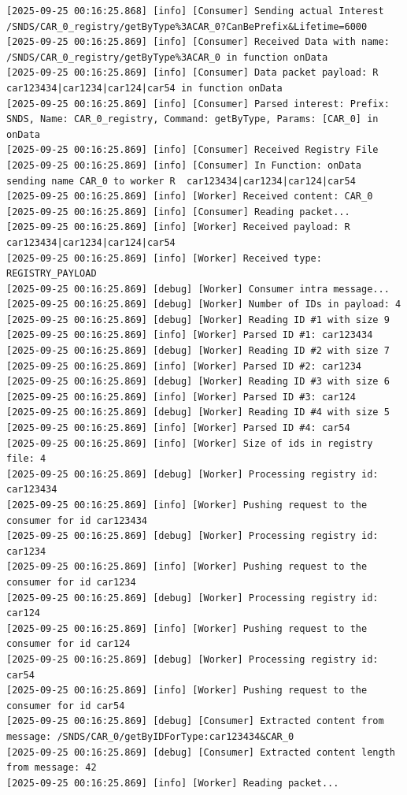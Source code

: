 \documentclass{article}
\begin{document}
\begin{lstlisting}[language=log, caption={D after performing a GET by TYPE for CAR\_0},label={lst:get-by-type-d}]
[2025-09-25 00:16:25.868] [info] [Consumer] Sending actual Interest /SNDS/CAR_0_registry/getByType%3ACAR_0?CanBePrefix&Lifetime=6000
[2025-09-25 00:16:25.869] [info] [Consumer] Received Data with name: /SNDS/CAR_0_registry/getByType%3ACAR_0 in function onData
[2025-09-25 00:16:25.869] [info] [Consumer] Data packet payload: R car123434|car1234|car124|car54 in function onData
[2025-09-25 00:16:25.869] [info] [Consumer] Parsed interest: Prefix: SNDS, Name: CAR_0_registry, Command: getByType, Params: [CAR_0] in onData
[2025-09-25 00:16:25.869] [info] [Consumer] Received Registry File
[2025-09-25 00:16:25.869] [info] [Consumer] In Function: onData sending name CAR_0 to worker R	car123434|car1234|car124|car54
[2025-09-25 00:16:25.869] [info] [Worker] Received content: CAR_0
[2025-09-25 00:16:25.869] [info] [Consumer] Reading packet...
[2025-09-25 00:16:25.869] [info] [Worker] Received payload: R car123434|car1234|car124|car54
[2025-09-25 00:16:25.869] [info] [Worker] Received type: REGISTRY_PAYLOAD
[2025-09-25 00:16:25.869] [debug] [Worker] Consumer intra message...
[2025-09-25 00:16:25.869] [debug] [Worker] Number of IDs in payload: 4
[2025-09-25 00:16:25.869] [debug] [Worker] Reading ID #1 with size 9
[2025-09-25 00:16:25.869] [info] [Worker] Parsed ID #1: car123434
[2025-09-25 00:16:25.869] [debug] [Worker] Reading ID #2 with size 7
[2025-09-25 00:16:25.869] [info] [Worker] Parsed ID #2: car1234
[2025-09-25 00:16:25.869] [debug] [Worker] Reading ID #3 with size 6
[2025-09-25 00:16:25.869] [info] [Worker] Parsed ID #3: car124
[2025-09-25 00:16:25.869] [debug] [Worker] Reading ID #4 with size 5
[2025-09-25 00:16:25.869] [info] [Worker] Parsed ID #4: car54
[2025-09-25 00:16:25.869] [info] [Worker] Size of ids in registry file: 4
[2025-09-25 00:16:25.869] [debug] [Worker] Processing registry id: car123434
[2025-09-25 00:16:25.869] [info] [Worker] Pushing request to the consumer for id car123434
[2025-09-25 00:16:25.869] [debug] [Worker] Processing registry id: car1234
[2025-09-25 00:16:25.869] [info] [Worker] Pushing request to the consumer for id car1234
[2025-09-25 00:16:25.869] [debug] [Worker] Processing registry id: car124
[2025-09-25 00:16:25.869] [info] [Worker] Pushing request to the consumer for id car124
[2025-09-25 00:16:25.869] [debug] [Worker] Processing registry id: car54
[2025-09-25 00:16:25.869] [info] [Worker] Pushing request to the consumer for id car54
[2025-09-25 00:16:25.869] [debug] [Consumer] Extracted content from message: /SNDS/CAR_0/getByIDForType:car123434&CAR_0
[2025-09-25 00:16:25.869] [debug] [Consumer] Extracted content length from message: 42
[2025-09-25 00:16:25.869] [info] [Worker] Reading packet...
\end{lstlisting}
\end{document}
